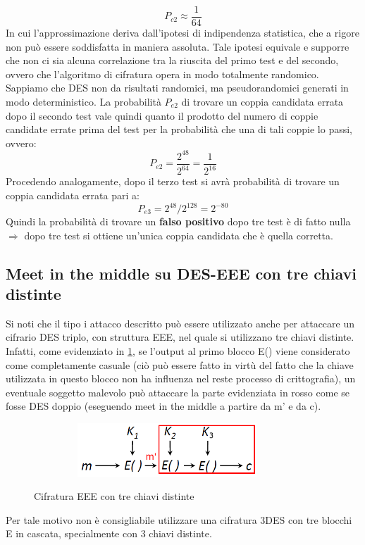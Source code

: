 \begin{equation}
P_{c2} \approx \frac{1}{64}
\end{equation}
In cui l'approssimazione deriva dall'ipotesi di indipendenza statistica, che a rigore non può essere soddisfatta in maniera assoluta. Tale ipotesi equivale e supporre che non ci sia alcuna correlazione tra la riuscita del primo test e del secondo, ovvero che l'algoritmo di cifratura opera in modo totalmente randomico. Sappiamo che DES non da risultati randomici, ma pseudorandomici generati in modo deterministico.
\newline \newline
La probabilità $P_{e2}$ di trovare un coppia candidata errata dopo il secondo test vale quindi quanto il prodotto del numero di coppie candidate errate prima del test per la probabilità che una di tali coppie lo passi, ovvero:
\begin{equation}
P_{e2} = \frac{2^{48}}{2^{64}} = \frac{1}{2^{16}} 
\end{equation} 
Procedendo analogamente, dopo il terzo test si avrà probabilità di trovare un coppia candidata errata pari a:
\begin{equation}
P_{e3} = 2^{48} / 2^{128} = 2^{-80}
\end{equation}
Quindi la probabilità di trovare un \textbf{falso positivo} dopo tre test è di fatto nulla $\Rightarrow$ dopo tre test si ottiene un'unica coppia candidata che è quella corretta.

\subsection{Meet in the middle su DES-EEE con tre chiavi distinte}
Si noti che il tipo i attacco descritto può essere utilizzato anche per attaccare un cifrario DES triplo, con struttura EEE, nel quale si utilizzano tre chiavi distinte. Infatti, come evidenziato in \ref{fig:EEE}, se l'output al primo blocco E() viene considerato come completamente casuale (ciò può essere fatto in virtù del fatto che la chiave utilizzata in questo blocco non ha influenza nel reste processo di crittografia), un eventuale soggetto malevolo può attaccare la parte evidenziata in rosso come se fosse DES doppio (eseguendo meet in the middle a partire da m' e da c).
\begin{figure}[htbp]
	\centering%
	\subfigure%
	{\includegraphics[height=2cm, width=10cm, keepaspectratio]{Immagini/modalita_operative/EEE.png}}
	\caption{Cifratura EEE con tre chiavi distinte \label{fig:EEE}} 	
\end{figure}
Per tale motivo non è consigliabile utilizzare una cifratura 3DES con tre blocchi E in cascata, specialmente con 3 chiavi distinte.
